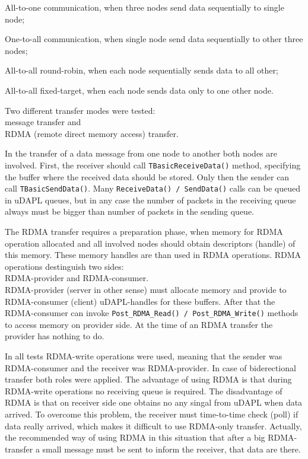 \begin{compactitem}[$\bullet$]
 \item All-to-one communication, when three nodes send data sequentially to single node; 
 \item One-to-all communication, when single node send data sequentially to other three nodes; 
 \item All-to-all round-robin, when each node sequentially sends data to all other; 
 \item All-to-all fixed-target, when each node sends data only to one other node.
\end{compactitem} 

Two different transfer modes were tested: \\
message transfer and \\
RDMA (remote direct memory access) transfer.

In the transfer of a data message from one node to another both nodes are involved. 
First, the receiver should call {\tt TBasic\:\:ReceiveData()} method, 
specifying the buffer where the received data should be stored.
Only then the sender can call {\tt TBasic\:\:SendData()}. 
Many {\tt ReceiveData() / SendData()} calls can be queued in uDAPL queues, but in any case the number
of packets in the receiving queue always must be bigger than number of packets in the sending queue.

The RDMA transfer requires a preparation phase, when memory for RDMA operation allocated and 
all involved nodes should obtain descriptors (handle) of this memory. 
These memory handles are than used in RDMA operations. 
RDMA operations destinguish two sides: \\
RDMA-provider and RDMA-consumer.\\
RDMA-provider (server in other sense) must allocate memory and provide to RDMA-consumer (client) 
uDAPL-handles for these buffers. 
After that the RDMA-consumer can invoke {\tt Post\_RDMA\_Read() / Post\_RDMA\_Write()} methods 
to access memory on provider side. 
At the time of an RDMA transfer the provider has nothing to do.

In all tests RDMA-write operations were used, 
meaning that the sender was RDMA-consumer and the receiver was RDMA-provider. 
In case of biderectional transfer both roles were applied. 
The advantage of using RDMA is that during RDMA-write operations 
no receiving queue is required.
The disadvantage of RDMA is that on receiver side one obtains no any singal 
from uDAPL when data arrived.
To overcome this problem, the receiver must time-to-time check (poll) if data really arrived, 
which makes it difficult to use RDMA-only transfer.
Actually, the recommended way of using RDMA in this situation that after a big RDMA-transfer 
a small message must be sent to inform the receiver, that data are there.

